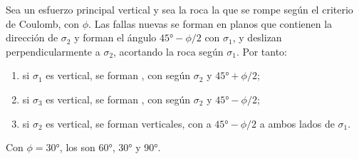 \begin{theorem}\label{thm:b1:faults-folds-fabrics:anderson}
Sea un esfuerzo principal vertical y sea la roca la que se rompe según el criterio de Coulomb, con 
$\phi$. Las fallas nuevas se forman en planos que contienen la dirección de $\sigma_2$ y forman el ángulo $\ang{45} - \phi/2$
con $\sigma_1$, y deslizan perpendicularmente a $\sigma_2$, acortando la roca según $\sigma_1$. Por tanto:
\begin{enumerate}[label=(\alph*)]
  \item si $\sigma_1$ es vertical, se forman , con  según $\sigma_2$ y 
        $\ang{45} + \phi/2$;
  \item si $\sigma_3$ es vertical, se forman , con  según $\sigma_2$ y 
        $\ang{45} - \phi/2$;
  \item si $\sigma_2$ es vertical, se forman  verticales, con  a
        $\ang{45} - \phi/2$ a ambos lados de $\sigma_1$.
\end{enumerate}
Con $\phi = \ang{30}$, los  son \ang{60}, \ang{30} y \ang{90}.
\end{theorem}

